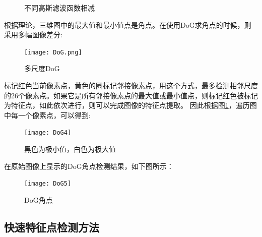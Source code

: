 \begin{figure}[H]
\begin{subfigure}[ht]{0.3\textwidth}
	\end{subfigure}
	\caption{不同高斯滤波函数相减}\label{differentsigma}
\end{figure}
根据理论，三维图中的最大值和最小值点是角点。在使用DoG求角点的时候，则采用多幅图像差分:\par
\begin{figure}[H]
	\centering
	\texttt{[image: DoG.png]}
	\caption{多尺度DoG}
\end{figure}\par
标记红色当前像素点，黄色的圈标记邻接像素点，用这个方式，最多检测相邻尺度的26个像素点。如果它是所有邻接像素点的最大值或最小值点，则标记红色被标记为特征点，如此依次进行，则可以完成图像的特征点提取。
因此根据图\ref{differentsigma}，遍历图中每一个像素点，可以得到:
\begin{figure}
	\centering
	\texttt{[image: DoG4]}
	\caption{黑色为极小值，白色为极大值}
\end{figure}
在原始图像上显示的DoG角点检测结果，如下图所示：
\begin{figure}
	\centering
	\texttt{[image: DoG5]}
	\caption{DoG角点}
\end{figure}





\subsection{快速特征点检测方法}